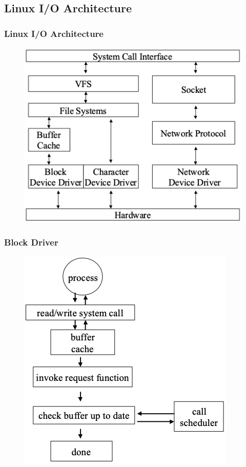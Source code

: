 \subsection{Linux I/O Architecture} %
\begin{frame}[fragile]
    \frametitle{Linux I/O Architecture}
    \begin{figure}
    \includegraphics[width=0.57\linewidth]{figs/io-architecture.png}
    \end{figure}
\end{frame}
% 
% 
% 
\begin{frame}[fragile]
    \frametitle{Block Driver}
    \begin{figure}
    \includegraphics[width=0.47\linewidth]{figs/block-driver.png}
    \end{figure}
\end{frame}
